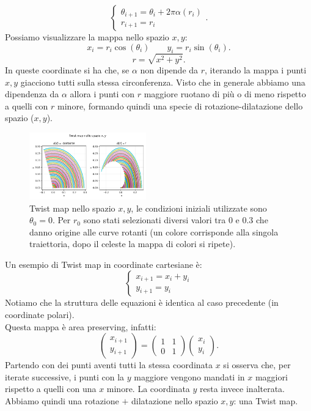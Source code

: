 \begin{exmp}
    \[
        \begin{cases}
	    \theta_{i+1} = \theta_i + 2\pi\alpha (r_i)\\
	    r_{i+1}=r_i
        \end{cases}
    .\] 
    Possiamo visualizzare la mappa nello spazio $x, y$:
    \[
	x_i = r_i\cos (\theta_i) \qquad y_i = r_i\sin (\theta_i)
    .\] 
    \[
        r = \sqrt{x^2+y^2} 
    .\] 
    In queste coordinate si ha che, se $\alpha$ non dipende da $r$, iterando la mappa i punti $x, y$ giacciono tutti sulla stessa circonferenza.
    Visto che in generale abbiamo una dipendenza da $\alpha$ allora i punti con $r$ maggiore ruotano di più o di meno rispetto a quelli con $r$ minore, formando quindi una specie di rotazione-dilatazione dello spazio ($x, y$).
    \begin{figure}[H]
        \centering
	\includegraphics[width=0.45\textwidth]{figures/18_twist_tetha_r.png}
	\caption{\scriptsize Twist map nello spazio $x, y$, le condizioni iniziali utilizzate sono $\theta_0 = 0$. Per $r_0$ sono stati selezionati diversi valori tra $0$ e $0.3$ che danno origine alle curve rotanti (un colore corrisponde alla singola traiettoria, dopo il celeste la mappa di colori si ripete).}
        \label{fig:-figures-18_twist_tetha_r-png}
    \end{figure}
\end{exmp}
\noindent
\begin{exmp}
    Un esempio di Twist map in coordinate cartesiane è:
    \[
        \begin{cases}
            x_{i+1}=x_i+y_i\\
	    y_{i+1}=y_i
        \end{cases}
    \] 
    Notiamo che la struttura delle equazioni è identica al caso precedente (in coordinate polari).\\
    Questa mappa è area preserving, infatti:
    \[
        \begin{pmatrix} x_{i+1} \\ y_{i+1} \end{pmatrix} =
	\begin{pmatrix} 
	    1 & 1 \\
	    0 & 1
	\end{pmatrix} 
	\begin{pmatrix} x_i \\ y_i \end{pmatrix} 
    .\] 
    Partendo con dei punti aventi tutti la stessa coordinata $x$ si osserva che, per iterate successive, i punti con la $y$ maggiore vengono mandati in $x$ maggiori rispetto a quelli con una $x$ minore. La coordinata $y$ resta invece inalterata.\\
    Abbiamo quindi una rotazione $+$ dilatazione nello spazio $x,y$: una Twist map.
\end{exmp}
\noindent
\clearpage
